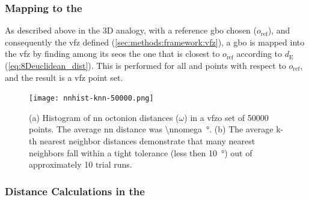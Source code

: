 \documentclass[final,twocolumn,12pt]{elsarticle}
\begin{document}
\subsubsection{Mapping  to the }
\label{sec:methods:framework:proj}

As described above in the 3D analogy, with a reference \gls{gbo} chosen ($o_{\text{ref}}$), and consequently the \gls{vfz} defined (\cref{sec:methods:framework:vfz}), a \gls{gbo} is mapped into the \gls{vfz} by finding among its \glspl{seo} the one that is closest to $o_{\text{ref}}$ according to $d_{\text{E}}$ (\cref{eq:8Deuclidean_dist}). This is performed for all \inpt{} and \outpt{} points with respect to $o_{\text{ref}}$, and the result is a \gls{vfz} point set.

\begin{figure}
\centering
\texttt{[image: nnhist-knn-50000.png]}
\caption{(a) Histogram of \gls{nn} octonion distances ($\omega$) in a \gls{vfzo} set of \num{50000} points. The average \gls{nn} distance was \SI{\nnomega}{\degree}. (b) The average k-th nearest neighbor distances demonstrate that many nearest neighbors fall within a tight tolerance (less then \SI{10}{\degree}) out of approximately 10 trial runs.}
\label{fig:nnhist-knn-50000}
\end{figure}

\subsubsection{Distance Calculations in the }
\label{sec:methods:framework:vfz-dist}
\end{document}
